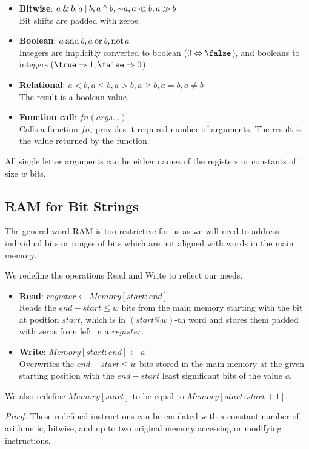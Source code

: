 \begin{enumerate}
\begin{itemize}
		\item \textbf{Bitwise}: $a \mathbin{\&} b, a \mathbin{|} b, a \mathbin{^\wedge} b, \mathord{\sim} a, a \mathbin{\ll} b, a \mathbin{\gg} b$ \\
		Bit shifts are padded with zeros.
		\item \textbf{Boolean}: $a \mathbin{\textrm{and}} b, a \mathbin{\textrm{or}} b, \mathord{\textrm{not}\,} a$ \\
		Integers are implicitly converted to boolean ($0 \Leftrightarrow \false$), and booleans to integers ($\true \Rightarrow 1; \false \Rightarrow 0$).
		\item \textbf{Relational}: $a < b, a \le b, a > b, a \ge b, a = b, a \ne b$ \\
		The result is a boolean value.
		\item \textbf{Function call}: $\mathit{fn}(\mathit{args}\ldots)$ \\
		Calls a function $\mathit{fn}$, provides it required number of arguments.
		The result is the value returned by the function.
	\end{itemize}
\end{enumerate}
All single letter arguments can be either names of the registers or constants of size $w$ bits.

\subsection{RAM for Bit Strings}

The general word-RAM is too restrictive for us as we will need to address individual bits or ranges of bits which are not aligned with words in the main memory.

\begin{lemma}
	We redefine the operations Read and Write to reflect our needs.
	
	\begin{itemize}
		\item \textbf{Read}: $\mathit{register} \gets \mathit{Memory}[\mathit{start}:\mathit{end}]$ \\
		Reads the $\mathit{end} - \mathit{start} \le w$ bits from the main memory starting with the bit at position $\mathit{start}$, which is in $(\mathit{start} \% w)$-th word and stores them padded with zeros from left in a $register$.
		\item \textbf{Write}: $\mathit{Memory}[\mathit{start}:\mathit{end}] \gets a$ \\
		Overwrites the $\mathit{end} - \mathit{start} \le w$ bits stored in the main memory at the given starting position with the $\mathit{end} - \mathit{start}$ least significant bits of the value $a$.
	\end{itemize}
	
	We also redefine $\mathit{Memory}[\mathit{start}]$ to be equal to $\mathit{Memory}[\mathit{start}:\mathit{start} + 1]$.
\end{lemma}
\begin{proof}
	These redefined instructions can be emulated with a constant number of arithmetic, bitwise, and up to two original memory accessing or modifying instructions.
\end{proof}

